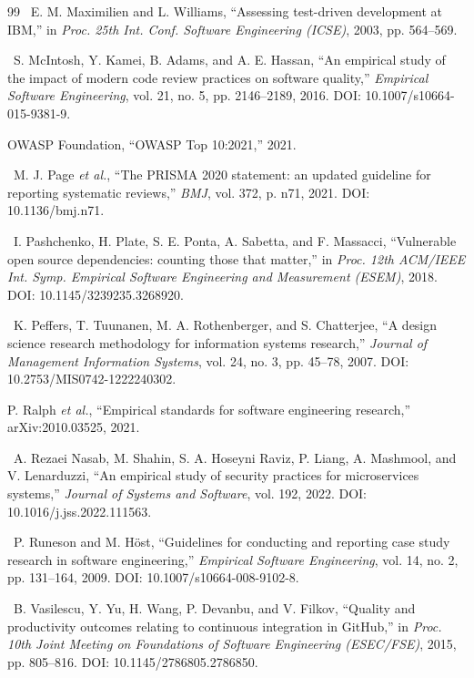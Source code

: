 \begin{thebibliography}{99}
\dag\ E. M. Maximilien and L. Williams, ``Assessing test-driven development at IBM,'' in \textit{Proc. 25th Int. Conf. Software Engineering (ICSE)}, 2003, pp. 564--569.

\dag\ S. McIntosh, Y. Kamei, B. Adams, and A. E. Hassan, ``An empirical study of the impact of modern code review practices on software quality,'' \textit{Empirical Software Engineering}, vol. 21, no. 5, pp. 2146--2189, 2016. DOI: 10.1007/s10664-015-9381-9.

 OWASP Foundation, ``OWASP Top 10:2021,'' 2021.

\dag\ M. J. Page \textit{et al.}, ``The PRISMA 2020 statement: an updated guideline for reporting systematic reviews,'' \textit{BMJ}, vol. 372, p. n71, 2021. DOI: 10.1136/bmj.n71.

\dag\ I. Pashchenko, H. Plate, S. E. Ponta, A. Sabetta, and F. Massacci, ``Vulnerable open source dependencies: counting those that matter,'' in \textit{Proc. 12th ACM/IEEE Int. Symp. Empirical Software Engineering and Measurement (ESEM)}, 2018. DOI: 10.1145/3239235.3268920.

\dag\ K. Peffers, T. Tuunanen, M. A. Rothenberger, and S. Chatterjee, ``A design science research methodology for information systems research,'' \textit{Journal of Management Information Systems}, vol. 24, no. 3, pp. 45--78, 2007. DOI: 10.2753/MIS0742-1222240302.

 P. Ralph \textit{et al.}, ``Empirical standards for software engineering research,'' arXiv:2010.03525, 2021.

\dag\ A. Rezaei Nasab, M. Shahin, S. A. Hoseyni Raviz, P. Liang, A. Mashmool, and V. Lenarduzzi, ``An empirical study of security practices for microservices systems,'' \textit{Journal of Systems and Software}, vol. 192, 2022. DOI: 10.1016/j.jss.2022.111563.

\dag\ P. Runeson and M. Höst, ``Guidelines for conducting and reporting case study research in software engineering,'' \textit{Empirical Software Engineering}, vol. 14, no. 2, pp. 131--164, 2009. DOI: 10.1007/s10664-008-9102-8.

\dag\ B. Vasilescu, Y. Yu, H. Wang, P. Devanbu, and V. Filkov, ``Quality and productivity outcomes relating to continuous integration in GitHub,'' in \textit{Proc. 10th Joint Meeting on Foundations of Software Engineering (ESEC/FSE)}, 2015, pp. 805--816. DOI: 10.1145/2786805.2786850.


\end{thebibliography}

